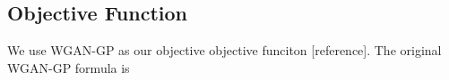 \subsection{Objective Function}
We use WGAN-GP as our objective objective funciton [reference]. The original WGAN-GP formula is 